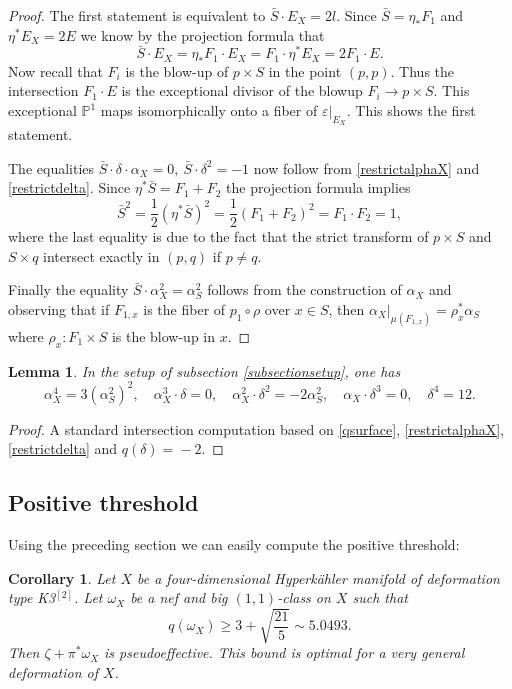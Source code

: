 \documentclass[11pt]{article}
\theoremstyle{plain}
\newtheorem{corollary}[theorem]{Corollary}
\newtheorem{lemma}[theorem]{Lemma}
\theoremstyle{definition}
\newcommand{\PP}{\ensuremath{\mathbb{P}}}
\begin{document}
\begin{proof}
The first statement is equivalent to $\bar S \cdot E_X = 2l$.
Since $\bar S = \eta_* F_1$ and $\eta^* E_X = 2 E$ we know by the projection formula that
\[
\bar S \cdot E_X = \eta_* F_1 \cdot E_X = F_1 \cdot \eta^* E_X = 2 F_1 \cdot E.
\]
Now recall that $F_i$ is the blow-up of $p \times S$ in the point $(p,p)$. Thus the intersection $F_1 \cdot E$ is the
exceptional divisor of the blowup $F_i \to p \times S$. This exceptional $\PP^1$
maps isomorphically onto a fiber of $\varepsilon|_{E_X}$. This shows the first statement.

The equalities $\bar S \cdot \delta \cdot \alpha_X = 0, \ \bar S \cdot \delta^2=-1$ now follow from
\eqref{restrictalphaX} and \eqref{restrictdelta}.
Since $\eta^* \bar S = F_1 + F_2$ the projection formula implies
\[
\bar S^2 = \frac{1}{2} (\eta^* \bar S)^2 = \frac{1}{2} (F_1 + F_2)^2 = F_1 \cdot F_2 = 1,
\]
where the last equality is due to the fact that the strict transform of $p \times S$ and $S \times q$ intersect exactly
in $(p,q)$ if $p \neq q$.

Finally the equality $\bar S \cdot \alpha_X^2=\alpha_S^2$ follows from the construction of $\alpha_X$ \cite[\S 6, Prop.\,6]{Bea83} and observing that if $F_{1,x}$ is the fiber of $p_1 \circ \rho$ over $x \in S$, then
$\alpha_X|_{\mu(F_{1,x})} = \rho_x^* \alpha_S$ where $\rho_x: F_1 \times S$ is the blow-up in $x$.
\end{proof}

\begin{lemma} \label{intersectionsX}
In the setup of subsection \ref{subsectionsetup}, one has
\[
\alpha_X^4 = 3 (\alpha_S^2)^2,
\quad
\alpha_X^3 \cdot \delta = 0,
\quad
\alpha_X^2 \cdot \delta^2 = - 2 \alpha_S^2,
\quad
\alpha_X \cdot \delta^3 = 0,
\quad
\delta^4 = 12.
\]
\end{lemma}

\begin{proof}
A standard intersection computation based on \eqref{qsurface}, \eqref{restrictalphaX},
\eqref{restrictdelta} and \hbox{$q(\delta)\!=\!-2$}.
\end{proof}

\subsection{Positive threshold}

Using the preceding section we can easily compute the positive threshold:

\begin{corollary}\label{corollaryK3square}
Let $X$ be a four-dimensional Hyperkähler manifold of deformation type K3$^{[2]}$.
Let $\omega_X$ be a nef and big $(1,1)$-class on $X$ such that
\[
q(\omega_X)\geq 3+\sqrt{\frac{21}{5}}\sim 5.0493.
\]
Then $\zeta+\pi^*\omega_X$ is pseudoeffective.
This bound is optimal for a very general deformation of $X$.
\end{corollary}
\end{document}

